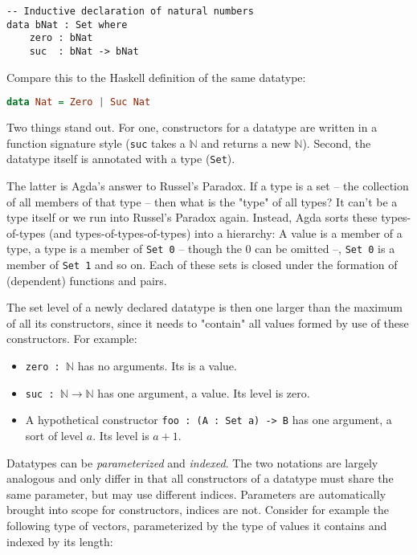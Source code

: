 \begin{lstlisting}[caption={Datatype definitions},label={lst:tutorial:datatypes}]
-- Inductive declaration of natural numbers
data bNat : Set where
    zero : bNat
    suc  : bNat -> bNat
\end{lstlisting}

Compare this to the Haskell definition of the same datatype:

\begin{lstlisting}[caption={Peano Numbers in Haskell},label={lst:haskell:peano},language=haskell]
data Nat = Zero | Suc Nat
\end{lstlisting}

Two things stand out. For one, constructors for a datatype are written in a function signature style (\texttt{suc} takes a \texttt{$\mathbb N$} and returns a new \texttt{$\mathbb N$}). Second, the datatype itself is annotated with a type (\texttt{Set}).

The latter is Agda's answer to Russel's Paradox. If a type is a set -- the collection of all members of that type -- then what is the "type" of all types? It can't be a type itself or we run into Russel's Paradox again. Instead, Agda sorts these types-of-types (and types-of-types-of-types) into a hierarchy: A value is a member of a type, a type is a member of \texttt{Set 0} -- though the 0 can be omitted --, \texttt{Set 0} is a member of \texttt{Set 1} and so on. Each of these sets is closed under the formation of (dependent) functions and pairs.

The set level of a newly declared datatype is then one larger than the maximum of all its constructors, since it needs to "contain" all values formed by use of these constructors. For example:

\begin{itemize}
    \setlength\itemsep{-0.4em}
    \item \texttt{zero : $\mathbb N$} has no arguments. Its is a value.
    \item \texttt{suc : $\mathbb N \to \mathbb N$}  has one argument, a value. Its level is zero.
    \item A hypothetical constructor \texttt{foo : (A : Set a) -> B} has one argument, a sort of level $a$. Its level is $a + 1$.
\end{itemize}

Datatypes can be \emph{parameterized} and \emph{indexed}. The two notations are largely analogous and only differ in that all constructors of a datatype must share the same parameter, but may use different indices. Parameters are automatically brought into scope for constructors, indices are not. Consider for example the following type of vectors, parameterized by the type of values it contains and indexed by its length:

